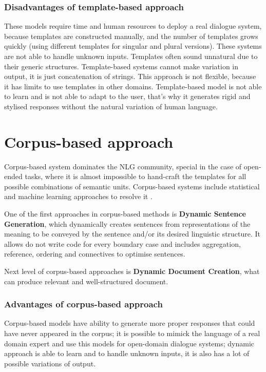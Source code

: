 \subsubsection{Disadvantages of template-based approach}
These models require time and human resources to deploy a real dialogue system, because templates are constructed manually, and the number of templates grows quickly (using different templates for singular and plural versions). These systems are not able to handle unknown inputs. Templates often sound unnatural due to their generic structures. Template-based systems cannot make variation in output, it is just concatenation of strings. This approach is not flexible, because it has limits to use templates in other domains. Template-based model is not able to learn and is not able to adapt to the user, that's why it generates rigid and stylised responses without the natural variation of human language.

\section{Corpus-based approach}
Corpus-based system dominates the NLG community, special in the case of open-ended tasks, where it is almost impossible to hand-craft the templates for all possible combinations of semantic units. Corpus-based systems include statistical and machine learning approaches to resolve it \cite{rudnicky2002dialog}.

One of the first approaches in corpus-based methods is \textbf{Dynamic Sentence Generation}, which dynamically creates sentences from representations of the meaning to be conveyed by the sentence and/or its desired linguistic structure. It allows do not write code for every boundary case and includes aggregation, reference, ordering and connectives to optimise sentences.

Next level of corpus-based approaches is \textbf{Dynamic Document Creation}, what can produce relevant and well-structured document. 

\subsubsection{Advantages of corpus-based approach}
Corpus-based models have ability to generate more proper responses that could have never appeared in the corpus; it is possible to mimick the language of a real domain expert and use this models for open-domain dialogue systems; dynamic approach is able to learn and to handle unknown inputs, it is also has a lot of possible variations of output.


